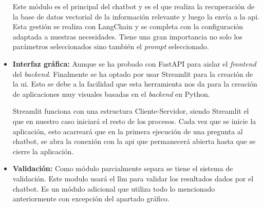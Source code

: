 \begin{itemize}
    Este módulo es el principal del chatbot y es el que realiza la recuperación de la base de datos vectorial de la información relevante y luego la envía a la \acrshort{api}. Esta gestión se realiza con LangChain y se completa con la configuración adaptada a nuestras necesidades. Tiene una gran importancia no solo los parámetros seleccionados sino también el \textit{prompt} seleccionado.

    \item \textbf{Interfaz gráfica:} Aunque se ha probado con FastAPI para aislar el \textit{frontend} del \textit{backend}. Finalmente se ha optado por usar Streamlit para la creación de la \acrshort{ui}. Esto se debe a la facilidad que esta herramienta nos da para la creación de aplicaciones muy visuales basadas en el \textit{backend} en Python.

    Streamlit funciona con una estructura Cliente-Servidor, siendo Streamlit el que en nuestro caso iniciará el resto de los procesos. Cada vez que se inicie la aplicación, esto acarreará que en la primera ejecución de una pregunta al chatbot, se abra la conexión con la \acrshort{api} que permanecerá abierta hasta que se cierre la aplicación. 

    \item \textbf{Validación:} Como módulo parcialmente separa se tiene el sistema de validación. Este modulo usará el \acrfull{llm} para validar los resultados dados por el chatbot. Es un módulo adicional que utiliza todo lo mencionado anteriormente con excepción del apartado gráfico.
 
\end{itemize}



